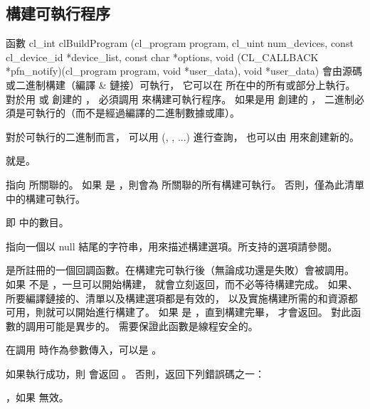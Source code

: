 \subsection{構建可執行程序}

函數
\startclc
cl_int clBuildProgram (cl_program program,
			cl_uint num_devices,
			const cl_device_id *device_list,
			const char *options,
			void (CL_CALLBACK *pfn_notify)(cl_program program,
						void *user_data),
			void *user_data)
\stopclc
會由源碼或二進制構建（編譯 & 鏈接）可執行，
它可以在  所在中的所有或部分上執行。
對於用  或  創建的 ，
必須調用  來構建可執行程序。
如果是用  創建的 ，
二進制必須是可執行的（而不是經過編譯的二進制數據或庫）。

對於可執行的二進制而言，
可以用 (, , ...) 進行查詢，
也可以由  用來創建新的。

 就是。

 指向  所關聯的。
如果  是 ，則會為  所關聯的所有構建可執行。
否則，僅為此清單中的構建可執行。

 即  中的數目。

 指向一個以 null 結尾的字符串，用來描述構建選項。所支持的選項請參閱。

 是所註冊的一個回調函數。在構建完可執行後（無論成功還是失敗）會被調用。
如果  不是 ，一旦可以開始構建，  就會立刻返回，而不必等待構建完成。
如果、所要編譯鏈接的、清單以及構建選項都是有效的，
以及實施構建所需的和資源都可用，則就可以開始進行構建了。
如果  是 ，直到構建完畢，  才會返回。
對此函數的調用可能是異步的。
需要保證此函數是線程安全的。

 在調用  時作為參數傳入，可以是 。

如果執行成功，則  會返回 。
否則，返回下列錯誤碼之一：
\startigBase
\item {}，如果  無效。

